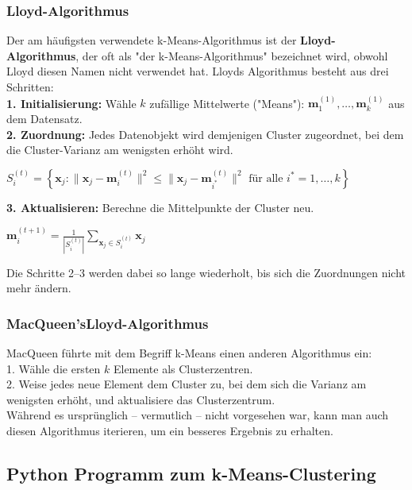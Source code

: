 \documentclass[12pt]{article}
\begin{document}
\subsubsection{Lloyd-Algorithmus}

Der am häufigsten verwendete k-Means-Algorithmus ist der \textbf{Lloyd-Algorithmus}, der oft als "der k-Means-Algorithmus" bezeichnet wird, obwohl Lloyd diesen Namen nicht verwendet hat. Lloyds Algorithmus besteht aus drei Schritten:\\[0.2cm]
\textbf{1. Initialisierung:} Wähle $k$ zufällige Mittelwerte ("Means"): $ \mathbf m_1^{(1)}, \ldots, \mathbf m_k^{(1)} $ aus dem Datensatz.\\
\textbf{2. Zuordnung:} Jedes Datenobjekt wird demjenigen Cluster zugeordnet, bei dem die Cluster-Varianz am wenigsten erhöht wird.
\begin{center}
$ S_i^{(t)} = \left\{ \mathbf x_j : \big\| \mathbf x_j - \mathbf m^{(t)}_i \big\|^2 \leq \big\| \mathbf x_j - \mathbf m^{(t)}_{i^*} \big\|^2 \text{ für alle }i^*=1,\ldots,k \right\}$\\[0.2cm]
\end{center}
\textbf{3. Aktualisieren:} Berechne die Mittelpunkte der Cluster neu.
\begin{center}
$ \mathbf m_i^{(t+1)} = \frac{1}{|S_i^{(t)}|} \sum_{\mathbf x_j \in S_{i}^{(t)}} \mathbf x_j  $ \\
\end{center}
Die Schritte 2–3 werden dabei so lange wiederholt, bis sich die Zuordnungen nicht mehr ändern.

\subsubsection{MacQueen'sLloyd-Algorithmus} 

MacQueen führte mit dem Begriff k-Means einen anderen Algorithmus ein:
\\[0.3cm]1. Wähle die ersten $k$ Elemente als Clusterzentren.\\
2. Weise jedes neue Element dem Cluster zu, bei dem sich die Varianz am wenigsten erhöht, und aktualisiere das Clusterzentrum.
\\[0.3cm]Während es ursprünglich – vermutlich – nicht vorgesehen war, kann man auch diesen Algorithmus iterieren, um ein besseres Ergebnis zu erhalten.

\subsection{Python Programm zum k-Means-Clustering}
\end{document}
